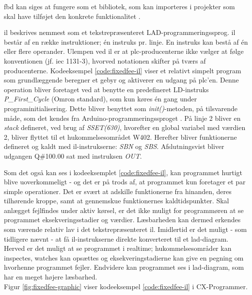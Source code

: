 
\noindent \gls{fbd} kan siges at fungere som et bibliotek, som kan importeres i projekter som skal have tilføjet den konkrete funktionalitet \cite{FDB_desc}.

\label{subsec:il-pa}
\gls{il} beskrives nemmest som et tekstrepræsenteret LAD-programmeringssprog. \gls{il} består af en række instruktioner; én instruks pr. linje. En instruks kan bestå af én eller flere operander. Ulempen ved \gls{il} er at \gls{plc}-producenterne ikke vælger at følge konventionen (jf. \gls{iec} 1131-3), hvorved notationen skifter på tværs af producenterne. Kodeeksempel \ref{code:fixedfee-il} viser et relativt simpelt program som grundlæggende beregner et gebyr og aktiverer en udgang på \gls{plc}'en. Denne operation bliver foretaget ved at benytte en predefineret LD-instruks \textit{P\_First\_Cycle} (Omron standard), som kun køres én gang under programinitialisering. Dette bliver benyttet som \textit{init()}-metoden, på tilsvarende måde, som det kendes fra Arduino-programmeringssproget \cite{ardiono_code_init}. På linje 2 bliver en \textit{stack} defineret, ved brug af \textit{SSET(630)}, hvorefter en global variabel med værdien 2, bliver flyttet til et hukommelsesområdet W402. Herefter bliver funktionerne defineret og kaldt med \gls{il}-instrukserne: \textit{SBN} og \textit{SBS}. Afslutningsvist bliver udgangen Q\#100.00 sat med instruksen \textit{OUT}. 


\noindent Som det også kan ses i kodeeksemplet \ref{code:fixedfee-il}, kan programmet hurtigt blive uoverkommeligt - og det er på trods af, at programmet kun foretager et par simple operationer. Det er svært at adskille funktionerne fra hinanden, deres tilhørende kroppe, samt at gennemskue funktionernes kaldtidspunkter. Skal anlægget fejlfindes under aktiv kørsel, er det ikke muligt for programmøren at se programmet eksekveringsstadier og værdier. Læsbarheden kan dermed erkendes som værende relativ lav i det tekstrepræsenteret \gls{il}. Imidlertid er det muligt - som tidligere nævnt - at få \gls{il}-instrukserne direkte konverteret til et \gls{lad}-diagram. Herved er det muligt at se programmet i realtime; hukommelsesområder kan inspectes, watches kan opsættes og eksekveringstadierne kan give en pegning om hvorhenne programmet fejler. Endvidere kan programmet ses i \gls{lad}-diagram, som har en meget højere læsbarhed. \\\noindent Figur \ref{fig:fixedfee-graphic} viser kodeeksempel \ref{code:fixedfee-il} i CX-Programmer.

